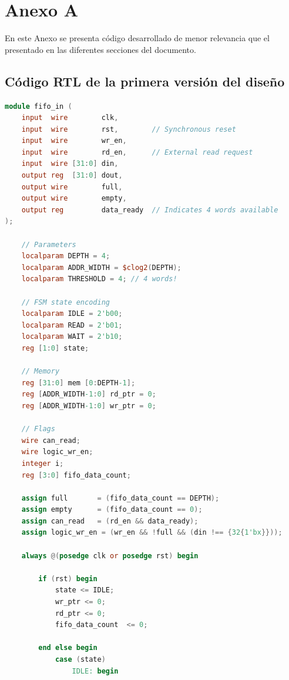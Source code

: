 \chapter{Anexo A}
\label{appendix:appendixA}
\parindent=16mm    
En este Anexo se presenta código desarrollado de menor relevancia que el presentado en las diferentes secciones del documento.

\section{Código RTL de la primera versión del diseño}
\label{sct:rtlPrimeraVersion}

\begin{lstlisting}[language=verilog,frame=single,caption={Código fuente de la cola FIFO de entrada de datos},showstringspaces=false,label=lst:legacyFifoIn]
module fifo_in (
    input  wire        clk,
    input  wire        rst,        // Synchronous reset
    input  wire        wr_en,
    input  wire        rd_en,      // External read request
    input  wire [31:0] din,
    output reg  [31:0] dout,
    output wire        full,
    output wire        empty,
    output reg         data_ready  // Indicates 4 words available
);

    // Parameters
    localparam DEPTH = 4;
    localparam ADDR_WIDTH = $clog2(DEPTH);
    localparam THRESHOLD = 4; // 4 words!
    
    // FSM state encoding
    localparam IDLE = 2'b00;
    localparam READ = 2'b01;
    localparam WAIT = 2'b10;
    reg [1:0] state;

    // Memory
    reg [31:0] mem [0:DEPTH-1];
    reg [ADDR_WIDTH-1:0] rd_ptr = 0;
    reg [ADDR_WIDTH-1:0] wr_ptr = 0;

    // Flags
    wire can_read;
    wire logic_wr_en;
    integer i;
    reg [3:0] fifo_data_count;
    
    assign full       = (fifo_data_count == DEPTH);
    assign empty      = (fifo_data_count == 0);
    assign can_read   = (rd_en && data_ready);
    assign logic_wr_en = (wr_en && !full && (din !== {32{1'bx}}));

    always @(posedge clk or posedge rst) begin
        
        if (rst) begin
            state <= IDLE;
            wr_ptr <= 0;
            rd_ptr <= 0;
            fifo_data_count  <= 0;
            
        end else begin
            case (state)
                IDLE: begin
                    

\end{lstlisting}
